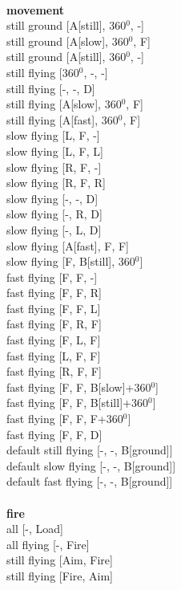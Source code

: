 \ \\ {\bf movement } \\
still ground [A[still], 360$^0$, -] \\
still ground [A[slow], 360$^0$, F] \\
still ground [A[still], 360$^0$, -] \\
still flying [360$^0$, -, -] \\
still flying [-, -, D] \\
still flying [A[slow], 360$^0$, F] \\
still flying [A[fast], 360$^0$, F] \\
slow flying [L, F, -] \\
slow flying [L, F, L] \\
slow flying [R, F, -] \\
slow flying [R, F, R] \\
slow flying [-, -, D] \\
slow flying [-, R, D] \\
slow flying [-, L, D] \\
slow flying [A[fast], F, F] \\
slow flying [F, B[still], 360$^0$] \\
fast flying [F, F, -] \\
fast flying [F, F, R] \\
fast flying [F, F, L] \\
fast flying [F, R, F] \\
fast flying [F, L, F] \\
fast flying [L, F, F] \\
fast flying [R, F, F] \\
fast flying [F, F, B[slow]+360$^0$] \\
fast flying [F, F, B[still]+360$^0$] \\
fast flying [F, F, F+360$^0$] \\
fast flying [F, F, D] \\
default still flying [-, -, B[ground]] \\
default slow flying [-, -, B[ground]] \\
default fast flying [-, -, B[ground]] \\
\ \\ {\bf fire } \\
all [-, Load] \\
all flying [-, Fire] \\
still flying [Aim, Fire] \\
still flying [Fire, Aim] \\



